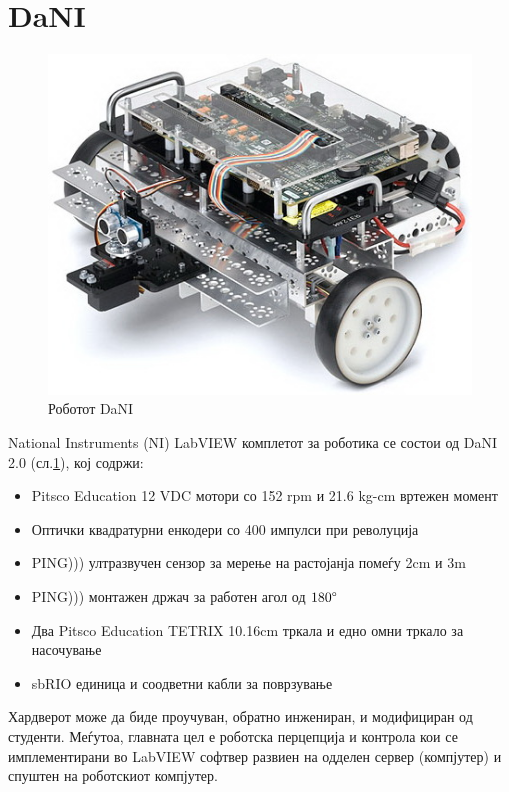 \documentclass[12pt]{article}
\begin{document}
\newpage

\section{DaNI}
  \begin{figure}[H]
    \includegraphics[width=0.6\linewidth, keepaspectratio]{./images/dani_isometric.jpg}
    \centering
    \caption{Роботот DaNI}
    \label{fig:dani_isometric}
    \end{figure}

	National Instruments (NI) LabVIEW комплетот за роботика се состои од DaNI 2.0 (сл.\ref{fig:dani_isometric}), кој содржи:

	\begin{itemize}
		\item Pitsco Education 12 VDC мотори со 152 rpm и 21.6 kg-cm вртежен момент
		\item Оптички квадратурни енкодери со 400 импулси при револуција
		\item PING))) ултразвучен сензор за мерење на растојанја помеѓу 2cm и 3m
		\item PING))) монтажен држач за работен агол од $180 \degree$
		\item Два Pitsco Education TETRIX 10.16cm тркала и едно омни тркало за насочување
		\item sbRIO единица и соодветни кабли за поврзување
		\end{itemize}

	Хардверот може да биде проучуван, обратно инжениран, и модифициран од студенти. Меѓутоа, главната цел е роботска перцепција и контрола кои се имплементирани во LabVIEW софтвер развиен на одделен сервер (компјутер) и спуштен на роботскиот компјутер.
\end{document}
